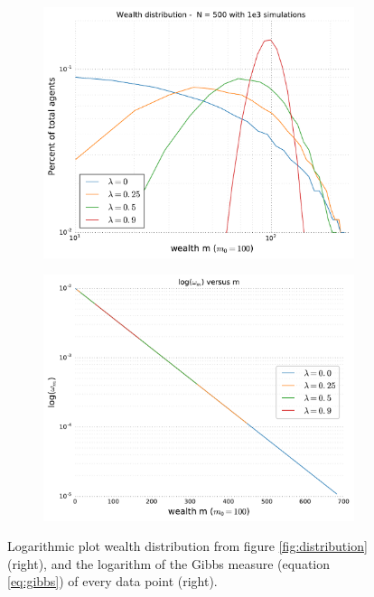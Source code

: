 \documentclass[10pt, a4paper]{amsart}
\begin{document}
\begin{figure}
\begin{subfigure}{.5\textwidth}
  \centering
  \includegraphics[width=\textwidth]{../figures/5ac/5cLOGLOG_N500_varSavings.pdf}
  \caption{}
  \label{fig:logdistribution}
\end{subfigure}%
\begin{subfigure}{.5\textwidth}
  \centering
  \includegraphics[width=\linewidth]{../figures/5ac/omega.pdf}
  \caption{}
  \label{fig:straightline}
\end{subfigure}
\caption{Logarithmic plot wealth distribution from figure \ref{fig:distribution} (right), and the logarithm of the Gibbs measure (equation \ref{eq:gibbs}) of every data point (right).}
\label{fig:logplot}
\end{figure}
\end{document}
